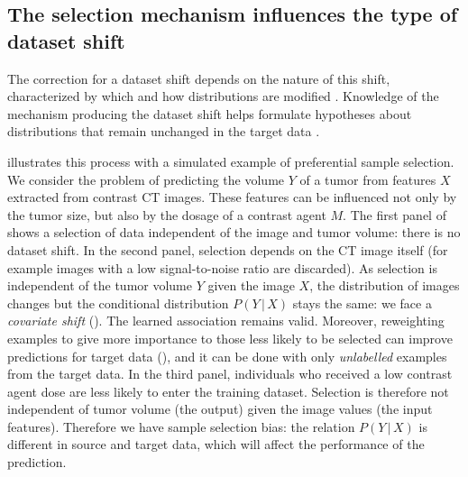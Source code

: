 \documentclass[twocolumn]{article}
\newcommand{\giv}{ \,|\, }
\begin{document}
\subsection{The selection mechanism influences the type of dataset shift}

The correction for a dataset shift depends on the nature of this shift, 
characterized by which and how distributions are modified \citep{storkey2009training}.
%
Knowledge of the mechanism producing the dataset shift 
helps formulate hypotheses about distributions that remain unchanged in the
target data \citep[Chap. 5]{scholkopf2012causal,peters2017elements}.

 illustrates this process
with a simulated example of preferential sample selection.
We consider the problem of predicting the volume \(Y\) of a tumor from
features \(X\) extracted from contrast CT images. These features can be
influenced not only by the tumor size, but also by the dosage of a contrast
agent \(M\).
%
The first panel of  shows a selection
of data independent of the image and tumor volume: there is no dataset shift.
%
In the second panel, selection depends on the CT image itself (for example images
with a low signal-to-noise ratio are discarded). As selection is independent of
the tumor volume \(Y\) given the image \(X\), the distribution of images changes but the
conditional distribution \(P(Y \giv X)\) stays the same: we face a
\emph{covariate shift} (). The learned association
remains valid.
%
Moreover, reweighting examples to give more importance to those
less likely to be selected can improve predictions for target
data (), and
it can be done with only \emph{unlabelled} examples from the target data.
%
In the third panel, individuals who received a low contrast agent dose are less
likely to enter the training dataset. Selection is therefore not independent of
tumor volume (the output) given the image values (the input features). Therefore
we have sample selection bias: the relation \(P(Y \giv X)\) is different in
source and target data, which will affect the performance of the prediction.
%
\end{document}
